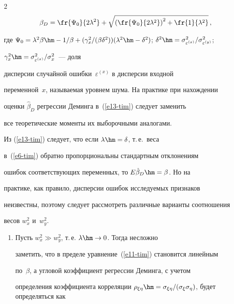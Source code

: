 \begin{multicols}{2}
\begin{equation}

\beta_D =\fr{\Psi_0}{2\lambda^2}+\sqrt{\left( \fr{\Psi_0}{2\lambda^2}\right)^2

+\fr{1}{\lambda^2}}\,,

\label{e13-tim}

\end{equation}

где $\Psi_0=\lambda^2\beta \hm- 1/\beta

+(\gamma_x^2/(\beta\delta^2))(\lambda^2 \hm- \delta^2)$; $\delta^2\hm=

\sigma^2_{\varepsilon^{(x)}}/\sigma^2_{\varepsilon^{(y)}}$;

$\gamma_x^2\hm=\sigma^2_{\varepsilon^{(x)}}/\sigma_x^2$~--- доля

дисперсии случайной ошибки~$\varepsilon^{(x)}$ в дисперсии входной

переменной~$x$, называемая уровнем шума. На практике при нахождении

оценки $\hat{\beta}_D$ регрессии Деминга в~(\ref{e13-tim}) следует заменить

все теоретические моменты их выборочными аналогами.



  Из (\ref{e13-tim}) следует, что если $\lambda\hm=\delta$, т.\,е.\ веса

в~(\ref{e6-tim}) обратно пропорциональны стандартным отклонениям

ошибок соответствующих переменных, то $E\hat{\beta}_D\hm=\beta$. Но на

практике, как правило, дис\-пер\-сии ошибок исследуемых признаков 

неизвестны, поэтому следует рассмотреть различные варианты соотношения

весов $w_x^2$ и~$w_y^2$.

  \begin{enumerate}[1.]

  \item

Пусть $w_x^2\gg w_y^2$, т.\,е. $\lambda\hm\to 0$. Тогда несложно

заметить, что в пределе уравнение~(\ref{e11-tim}) становится линейным

по~$\beta$, а угловой коэффициент регрессии Деминга, с учетом

определения коэффициента корреляции $\rho_{\xi\eta} \hm=

\sigma_{\xi\eta}/(\sigma_\xi \sigma_\eta)$, будет определяться как


\end{enumerate}
\end{multicols}
